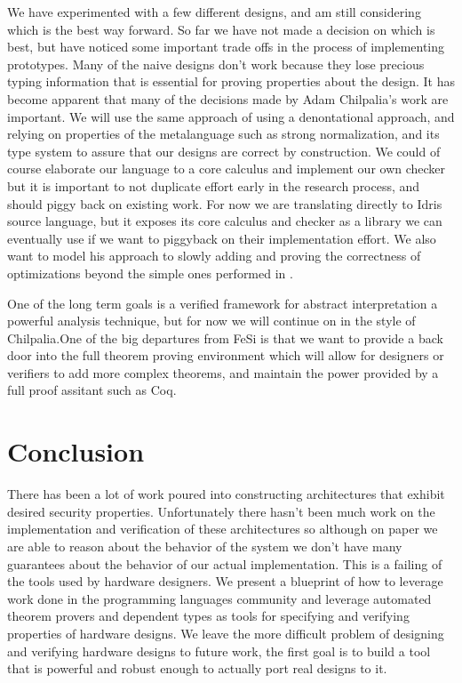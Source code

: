 \documentclass[12pt, titlepage]{article}
\begin{document}
We have experimented with a few different designs, and am still considering which is the best way forward.
So far we have not made a decision on which is best, but have noticed some important trade offs in the process
of implementing prototypes. Many of the naive designs don't work because they lose precious typing information
that is essential for proving properties about the design. It has become apparent that many of the decisions made
by Adam Chilpalia's work are important. We will use the same approach of using a denontational approach, and relying
on properties of the metalanguage such as strong normalization, and its type system to assure that our designs are
correct by construction. We could of course elaborate our language to a core calculus and implement our own checker
but it is important to not duplicate effort early in the research process, and should piggy back on existing work.
For now we are translating directly to Idris source language, but it exposes its core calculus and checker as a
library we can eventually use if we want to piggyback on their implementation effort. We also want to model his
approach to slowly adding and proving the correctness of optimizations beyond the simple ones performed in \cite{fesi}.

One of the long term goals is a verified framework for abstract interpretation a powerful analysis technique, but for
now we will continue on in the style of Chilpalia.One of the big departures from FeSi is that we want to provide a back door 
into the full theorem proving environment which will allow for designers or verifiers to add more complex theorems, and maintain 
the power provided by a full proof assitant such as Coq.

\section{Conclusion}

There has been a lot of work poured into constructing architectures that exhibit desired security properties. Unfortunately there hasn't been
much work on the implementation and verification of these architectures so although on paper we are able to reason about the behavior of the
system we don't have many guarantees about the behavior of our actual implementation. This is a failing of the tools used by hardware
designers. We present a blueprint of how to leverage work done in the programming languages community and leverage automated theorem provers
and dependent types as tools for specifying and verifying properties of hardware designs. We leave the more difficult problem of designing and
verifying hardware designs to future work, the first goal is to build a tool that is powerful and robust enough to actually port real designs
to it.



\end{document}
